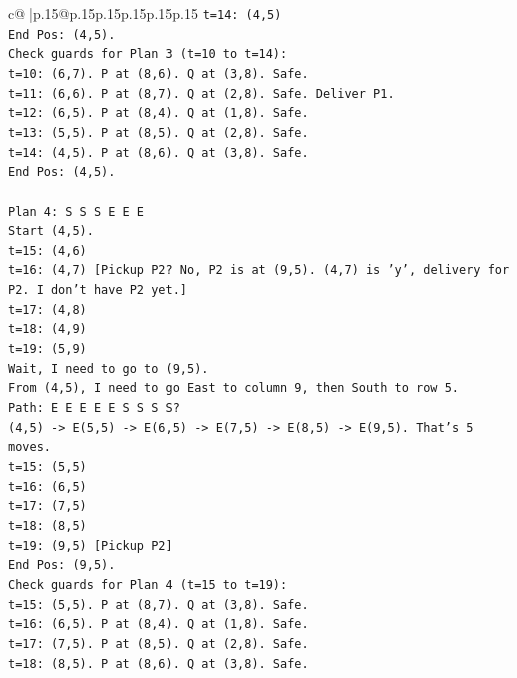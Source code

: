 \documentclass{article}
\begin{document}
{\begin{supertabular}{c@{$\;$}|p{.15\linewidth}@{}p{.15\linewidth}p{.15\linewidth}p{.15\linewidth}p{.15\linewidth}p{.15\linewidth}}
{{{\texttt{t=14: (4,5)} \\
\texttt{End Pos: (4,5).} \\
\texttt{Check guards for Plan 3 (t=10 to t=14):} \\
\texttt{t=10: (6,7). P at (8,6). Q at (3,8). Safe.} \\
\texttt{t=11: (6,6). P at (8,7). Q at (2,8). Safe. Deliver P1.} \\
\texttt{t=12: (6,5). P at (8,4). Q at (1,8). Safe.} \\
\texttt{t=13: (5,5). P at (8,5). Q at (2,8). Safe.} \\
\texttt{t=14: (4,5). P at (8,6). Q at (3,8). Safe.} \\
\texttt{End Pos: (4,5).} \\
\\ 
\texttt{Plan 4: S S S E E E} \\
\texttt{Start (4,5).} \\
\texttt{t=15: (4,6)} \\
\texttt{t=16: (4,7) {[}Pickup P2? No, P2 is at (9,5). (4,7) is 'y', delivery for P2. I don't have P2 yet.{]}} \\
\texttt{t=17: (4,8)} \\
\texttt{t=18: (4,9)} \\
\texttt{t=19: (5,9)} \\
\texttt{Wait, I need to go to (9,5).} \\
\texttt{From (4,5), I need to go East to column 9, then South to row 5.} \\
\texttt{Path: E E E E E S S S S?} \\
\texttt{(4,5) {-}> E(5,5) {-}> E(6,5) {-}> E(7,5) {-}> E(8,5) {-}> E(9,5). That's 5 moves.} \\
\texttt{t=15: (5,5)} \\
\texttt{t=16: (6,5)} \\
\texttt{t=17: (7,5)} \\
\texttt{t=18: (8,5)} \\
\texttt{t=19: (9,5) {[}Pickup P2{]}} \\
\texttt{End Pos: (9,5).} \\
\texttt{Check guards for Plan 4 (t=15 to t=19):} \\
\texttt{t=15: (5,5). P at (8,7). Q at (3,8). Safe.} \\
\texttt{t=16: (6,5). P at (8,4). Q at (1,8). Safe.} \\
\texttt{t=17: (7,5). P at (8,5). Q at (2,8). Safe.} \\
\texttt{t=18: (8,5). P at (8,6). Q at (3,8). Safe.} \\
}}}
\end{supertabular}}
\end{document}
